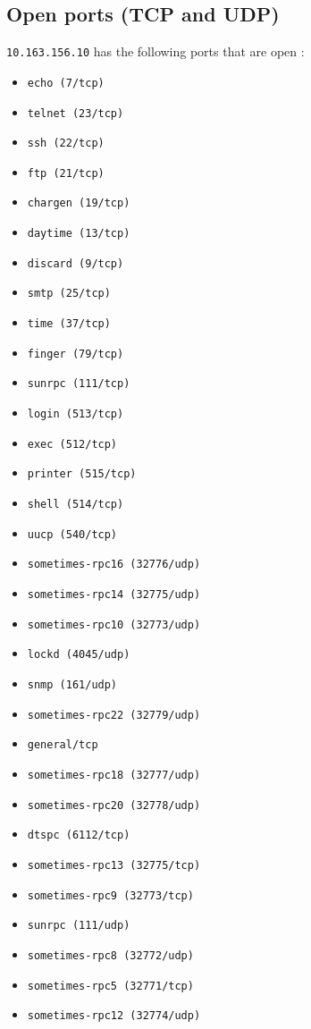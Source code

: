 \documentclass{article}
\begin{document}
\subsection{Open ports (TCP and UDP)}
\verb+10.163.156.10+ has the following ports that are open : 
\begin{itemize}
\item\verb+echo (7/tcp)+
\item\verb+telnet (23/tcp)+
\item\verb+ssh (22/tcp)+
\item\verb+ftp (21/tcp)+
\item\verb+chargen (19/tcp)+
\item\verb+daytime (13/tcp)+
\item\verb+discard (9/tcp)+
\item\verb+smtp (25/tcp)+
\item\verb+time (37/tcp)+
\item\verb+finger (79/tcp)+
\item\verb+sunrpc (111/tcp)+
\item\verb+login (513/tcp)+
\item\verb+exec (512/tcp)+
\item\verb+printer (515/tcp)+
\item\verb+shell (514/tcp)+
\item\verb+uucp (540/tcp)+
\item\verb+sometimes-rpc16 (32776/udp)+
\item\verb+sometimes-rpc14 (32775/udp)+
\item\verb+sometimes-rpc10 (32773/udp)+
\item\verb+lockd (4045/udp)+
\item\verb+snmp (161/udp)+
\item\verb+sometimes-rpc22 (32779/udp)+
\item\verb+general/tcp+
\item\verb+sometimes-rpc18 (32777/udp)+
\item\verb+sometimes-rpc20 (32778/udp)+
\item\verb+dtspc (6112/tcp)+
\item\verb+sometimes-rpc13 (32775/tcp)+
\item\verb+sometimes-rpc9 (32773/tcp)+
\item\verb+sunrpc (111/udp)+
\item\verb+sometimes-rpc8 (32772/udp)+
\item\verb+sometimes-rpc5 (32771/tcp)+
\item\verb+sometimes-rpc12 (32774/udp)+

\end{itemize}
\end{document}
